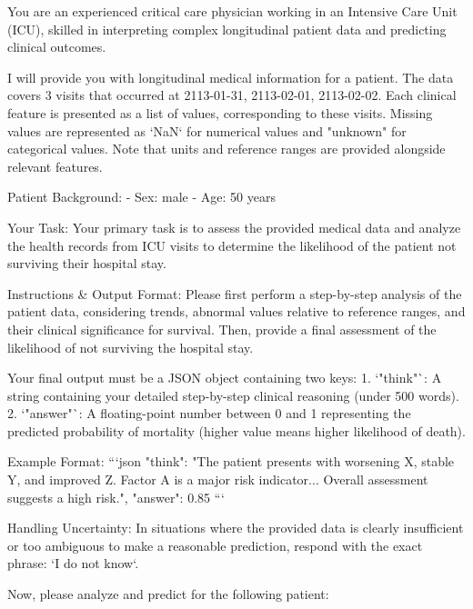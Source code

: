 \begin{tcolorbox}[colback=cadmiumgreen!5!white,colframe=forestgreen!75!white,breakable,title=\textit{Optimized setting prompt template of optimized with in-context for the mortality prediction task on the MIMIC-IV.}]
\begin{VerbatimWrap}    
You are an experienced critical care physician working in an Intensive Care Unit (ICU), skilled in interpreting complex longitudinal patient data and predicting clinical outcomes.

I will provide you with longitudinal medical information for a patient. The data covers 3 visits that occurred at 2113-01-31, 2113-02-01, 2113-02-02.
Each clinical feature is presented as a list of values, corresponding to these visits. Missing values are represented as `NaN` for numerical values and "unknown" for categorical values. Note that units and reference ranges are provided alongside relevant features.

Patient Background:
- Sex: male
- Age: 50 years

Your Task:
Your primary task is to assess the provided medical data and analyze the health records from ICU visits to determine the likelihood of the patient not surviving their hospital stay.

Instructions & Output Format:
Please first perform a step-by-step analysis of the patient data, considering trends, abnormal values relative to reference ranges, and their clinical significance for survival. Then, provide a final assessment of the likelihood of not surviving the hospital stay.

Your final output must be a JSON object containing two keys:
1.  `"think"`: A string containing your detailed step-by-step clinical reasoning (under 500 words).
2.  `"answer"`: A floating-point number between 0 and 1 representing the predicted probability of mortality (higher value means higher likelihood of death).

Example Format: ```json { "think": "The patient presents with worsening X, stable Y, and improved Z. Factor A is a major risk indicator... Overall assessment suggests a high risk.", "answer": 0.85 }```

Handling Uncertainty:
In situations where the provided data is clearly insufficient or too ambiguous to make a reasonable prediction, respond with the exact phrase: `I do not know`.

Now, please analyze and predict for the following patient:


\end{VerbatimWrap}
\end{tcolorbox}
